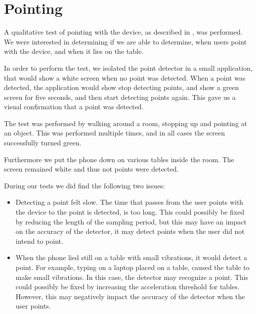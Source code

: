 \section{Pointing}
\label{sec:evaluation:pointing}

A qualitative test of pointing with the device, 
as described in , 
was performed. 
We were interested in determining if we are able to determine, 
when users point with the device, 
and when it lies on the table.

In order to perform the test, 
we isolated the point detector in a small application, 
that would show a white screen when no point was detected. 
When a point was detected, 
the application would show stop detecting points, 
and show a green screen for five seconds, 
and then start detecting points again.
This gave us a visual confirmation that a point was detected.

The test was performed by walking around a room, 
stopping up and pointing at an object. 
This was performed multiple times, 
and in all cases the screen successfully turned green.

Furthermore we put the phone down on various tables inside the room. 
The screen remained white and thus not points were detected.

During our tests we did find the following two issues:
\begin{itemize}
\item Detecting a point felt slow. The time that passes from the user points with the device to the point is detected, is too long. This could possibly be fixed by reducing the length of the sampling period, but this may have an impact on the accuracy of the detector, \ie it may detect points when the user did not intend to point.
\item When the phone lied still on a table with small vibrations, it would detect a point. For example, typing on a laptop placed on a table, caused the table to make small vibrations. In this case, the detector may recognize a point. This could possibly be fixed by increasing the acceleration threshold for tables. However, this may negatively impact the accuracy of the detector when the user points.
\end{itemize}


